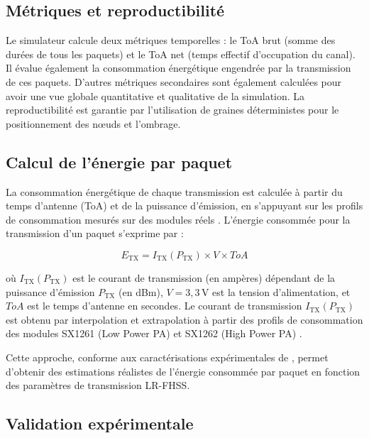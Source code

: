 \subsection{Métriques et reproductibilité}

Le simulateur calcule deux métriques temporelles : le ToA brut (somme des durées de tous les paquets) et le ToA net (temps effectif d’occupation du canal). Il évalue également la consommation énergétique engendrée par la transmission de ces paquets. D'autres métriques secondaires sont également calculées pour avoir une vue globale quantitative et qualitative de la simulation.  La reproductibilité est garantie par l'utilisation de graines déterministes pour le positionnement des nœuds et l'ombrage.

\subsection{Calcul de l'énergie par paquet}

La consommation énergétique de chaque transmission est calculée à partir du temps d'antenne (ToA) et de la puissance d'émission, en s'appuyant sur les profils de consommation mesurés sur des modules réels \cite{ullah2024_energy}. L'énergie consommée pour la transmission d'un paquet s'exprime par :

\begin{equation}
	E_{\text{TX}} = I_{\text{TX}}(P_{\text{TX}}) \times V \times ToA
	\label{eq:energie_tx}
\end{equation}

où \(I_{\text{TX}}(P_{\text{TX}})\) est le courant de transmission (en ampères) dépendant de la puissance d'émission \(P_{\text{TX}}\) (en dBm), \(V = 3,3\,\text{V}\) est la tension d'alimentation, et \(ToA\) est le temps d'antenne en secondes. Le courant de transmission \(I_{\text{TX}}(P_{\text{TX}})\) est obtenu par interpolation et extrapolation à partir des profils de consommation des modules SX1261 (Low Power PA) et SX1262 (High Power PA) \cite{semtech_1261_2}.

Cette approche, conforme aux caractérisations expérimentales de \cite{sanchez2024}, permet d'obtenir des estimations réalistes de l'énergie consommée par paquet en fonction des paramètres de transmission LR-FHSS.

\subsection{Validation expérimentale}

